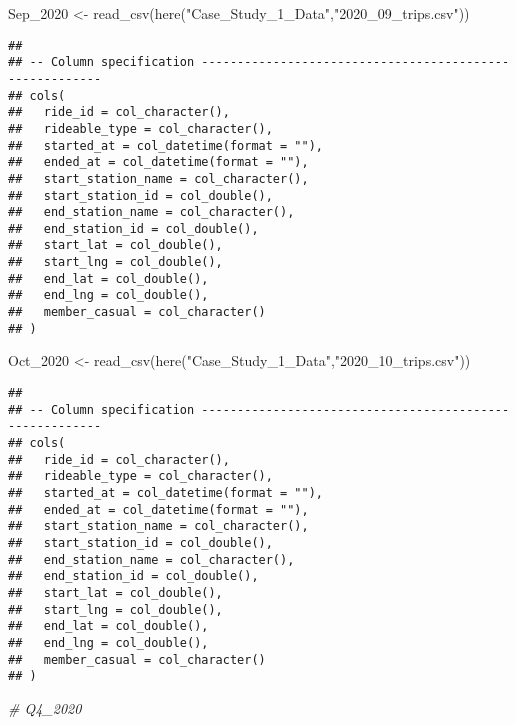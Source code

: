 \documentclass[
]{article}
\newenvironment{Shaded}{\begin{snugshade}}{\end{snugshade}}
\newcommand{\CommentTok}[1]{\textcolor[rgb]{0.56,0.35,0.01}{\textit{#1}}}
\newcommand{\FunctionTok}[1]{\textcolor[rgb]{0.00,0.00,0.00}{#1}}
\newcommand{\NormalTok}[1]{#1}
\newcommand{\OtherTok}[1]{\textcolor[rgb]{0.56,0.35,0.01}{#1}}
\newcommand{\StringTok}[1]{\textcolor[rgb]{0.31,0.60,0.02}{#1}}
\begin{document}
\begin{Shaded}
\begin{Highlighting}[]
\NormalTok{ Sep\_2020 }\OtherTok{\textless{}{-}} \FunctionTok{read\_csv}\NormalTok{(}\FunctionTok{here}\NormalTok{(}\StringTok{"Case\_Study\_1\_Data"}\NormalTok{,}\StringTok{"2020\_09\_trips.csv"}\NormalTok{))}
\end{Highlighting}
\end{Shaded}

\begin{verbatim}
## 
## -- Column specification --------------------------------------------------------
## cols(
##   ride_id = col_character(),
##   rideable_type = col_character(),
##   started_at = col_datetime(format = ""),
##   ended_at = col_datetime(format = ""),
##   start_station_name = col_character(),
##   start_station_id = col_double(),
##   end_station_name = col_character(),
##   end_station_id = col_double(),
##   start_lat = col_double(),
##   start_lng = col_double(),
##   end_lat = col_double(),
##   end_lng = col_double(),
##   member_casual = col_character()
## )
\end{verbatim}

\begin{Shaded}
\begin{Highlighting}[]
\NormalTok{ Oct\_2020 }\OtherTok{\textless{}{-}} \FunctionTok{read\_csv}\NormalTok{(}\FunctionTok{here}\NormalTok{(}\StringTok{"Case\_Study\_1\_Data"}\NormalTok{,}\StringTok{"2020\_10\_trips.csv"}\NormalTok{))}
\end{Highlighting}
\end{Shaded}

\begin{verbatim}
## 
## -- Column specification --------------------------------------------------------
## cols(
##   ride_id = col_character(),
##   rideable_type = col_character(),
##   started_at = col_datetime(format = ""),
##   ended_at = col_datetime(format = ""),
##   start_station_name = col_character(),
##   start_station_id = col_double(),
##   end_station_name = col_character(),
##   end_station_id = col_double(),
##   start_lat = col_double(),
##   start_lng = col_double(),
##   end_lat = col_double(),
##   end_lng = col_double(),
##   member_casual = col_character()
## )
\end{verbatim}

\begin{Shaded}
\begin{Highlighting}[]
\CommentTok{\# Q4\_2020 }
\end{Highlighting}
\end{Shaded}
\end{document}
